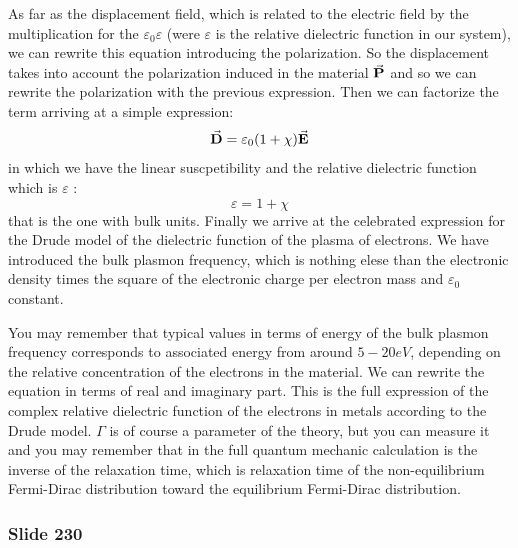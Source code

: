 \documentclass[../main/main.tex]{subfiles}
\begin{document}
As far as the displacement field, which is related to the electric field by the multiplication for the \( \varepsilon _0 \varepsilon  \) (were \( \varepsilon  \) is the relative dielectric function in our system), we can rewrite this equation introducing the polarization. So the displacement takes into account the polarization induced in the material \(\va{P} \) and so we can rewrite the polarization with the previous expression. Then we can factorize the term arriving at a simple expression:
\begin{equation*}
  \va{D} = \varepsilon _0 (1 + \chi ) \va{E}
\end{equation*}
in which we have the linear suscpetibility and the relative dielectric function which is \( \varepsilon  \) :
\begin{equation*}
  \varepsilon = 1 + \chi
\end{equation*}
that is the one with bulk units.
Finally we arrive at the celebrated expression for the Drude model of the dielectric function of the plasma of electrons. We have introduced the bulk plasmon frequency, which is nothing elese than the electronic density times the square of the electronic charge per  electron mass and \( \varepsilon _0 \) constant.

You may remember that typical values in terms of energy of the bulk plasmon frequency corresponds to associated energy from around \( 5-20 eV \), depending on the relative concentration of the electrons in the material.
We can rewrite the equation in terms of real and imaginary part. This is the full expression of the complex relative dielectric function of the electrons in metals according to the Drude model. \( \Gamma  \) is of course a parameter of the theory, but you can measure it and you may remember that in the full quantum mechanic calculation is the inverse of the relaxation time, which is relaxation time of the non-equilibrium Fermi-Dirac distribution toward the equilibrium Fermi-Dirac distribution.

\newpage

\subsubsection{Slide 230}
\end{document}

